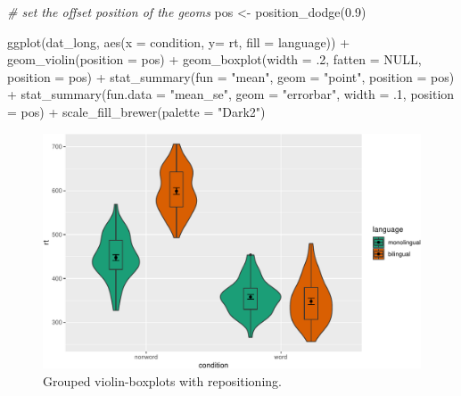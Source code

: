 \documentclass[
  english,
  doc,floatsintext]{apa6}
\newenvironment{Shaded}{\begin{snugshade}}{\end{snugshade}}
\newcommand{\AttributeTok}[1]{\textcolor[rgb]{0.77,0.63,0.00}{#1}}
\newcommand{\CommentTok}[1]{\textcolor[rgb]{0.56,0.35,0.01}{\textit{#1}}}
\newcommand{\ConstantTok}[1]{\textcolor[rgb]{0.00,0.00,0.00}{#1}}
\newcommand{\DecValTok}[1]{\textcolor[rgb]{0.00,0.00,0.81}{#1}}
\newcommand{\FloatTok}[1]{\textcolor[rgb]{0.00,0.00,0.81}{#1}}
\newcommand{\FunctionTok}[1]{\textcolor[rgb]{0.00,0.00,0.00}{#1}}
\newcommand{\NormalTok}[1]{#1}
\newcommand{\OtherTok}[1]{\textcolor[rgb]{0.56,0.35,0.01}{#1}}
\newcommand{\SpecialCharTok}[1]{\textcolor[rgb]{0.00,0.00,0.00}{#1}}
\newcommand{\StringTok}[1]{\textcolor[rgb]{0.31,0.60,0.02}{#1}}
\begin{document}
\begin{Shaded}
\begin{Highlighting}[]
\CommentTok{\# set the offset position of the geoms}
\NormalTok{pos }\OtherTok{\textless{}{-}} \FunctionTok{position\_dodge}\NormalTok{(}\FloatTok{0.9}\NormalTok{)}

\FunctionTok{ggplot}\NormalTok{(dat\_long, }\FunctionTok{aes}\NormalTok{(}\AttributeTok{x =}\NormalTok{ condition, }\AttributeTok{y=}\NormalTok{ rt, }\AttributeTok{fill =}\NormalTok{ language)) }\SpecialCharTok{+}
  \FunctionTok{geom\_violin}\NormalTok{(}\AttributeTok{position =}\NormalTok{ pos) }\SpecialCharTok{+}
  \FunctionTok{geom\_boxplot}\NormalTok{(}\AttributeTok{width =}\NormalTok{ .}\DecValTok{2}\NormalTok{, }
               \AttributeTok{fatten =} \ConstantTok{NULL}\NormalTok{, }
               \AttributeTok{position =}\NormalTok{ pos) }\SpecialCharTok{+}
  \FunctionTok{stat\_summary}\NormalTok{(}\AttributeTok{fun =} \StringTok{"mean"}\NormalTok{, }
               \AttributeTok{geom =} \StringTok{"point"}\NormalTok{, }
               \AttributeTok{position =}\NormalTok{ pos) }\SpecialCharTok{+}
  \FunctionTok{stat\_summary}\NormalTok{(}\AttributeTok{fun.data =} \StringTok{"mean\_se"}\NormalTok{, }
               \AttributeTok{geom =} \StringTok{"errorbar"}\NormalTok{, }
               \AttributeTok{width =}\NormalTok{ .}\DecValTok{1}\NormalTok{,}
               \AttributeTok{position =}\NormalTok{ pos) }\SpecialCharTok{+}
  \FunctionTok{scale\_fill\_brewer}\NormalTok{(}\AttributeTok{palette =} \StringTok{"Dark2"}\NormalTok{)}
\end{Highlighting}
\end{Shaded}

\begin{figure}

{\centering \includegraphics[width=1\linewidth]{images/viobox3-1} 

}

\caption{Grouped violin-boxplots with repositioning.}\label{fig:viobox3}
\end{figure}
\end{document}
